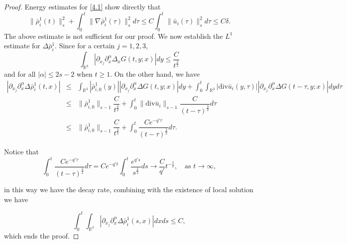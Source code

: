 \documentclass[reqno,twoside,12pt,a4paper]{amsart}
\newcommand{\R}{\mathbb{R}}
\newcommand{\al}{\alpha}
\newcommand{\dive}{\mathrm{div}}
\newcommand{\pa}{\partial}
\newcommand{\D}{\nabla}
\numberwithin{equation}{section}
\begin{document}
\begin{proof}
Energy estimates for \eqref{4.1} show directly that
\[
\|\bar{\rho}_i^1(t)\|_s^2+\int_0^t\|\D\bar{\rho}_i^1(\tau)\|_s^2d\tau\leq C\int_0^t\|\bar{u}_i(\tau)\|_s^2d\tau\leq C\delta.
\]
The above estimate is not sufficient for our proof. We now establish the $L^1$ estimate for $\Delta \bar{\rho}_{i}^1$. Since for a certain $j=1,2,3$,
\[
\int_{\R^3}|\pa_{x_j}\partial^\alpha_x \Delta_x G(t,y;x)|dy\leq \dfrac{C}{t^{\frac{3}{2}}}
\]
and for all $|\alpha|\leq 2s-2$ when $t\geq 1$.
On the other hand, we have
\begin{eqnarray}
|\pa_{x_j}\pa_x^\al \Delta\bar{\rho}_i^1(t,x)|&\leq&\int_{\R^3} |\bar{\rho}_{i,0}^1(y)||\pa_{x_j} \partial^\alpha_x \Delta G(t,y;x)|dy+ \int_0^t\int_{\R^3}|\dive\bar{u}_i(y,\tau)||\pa_{x_j} \partial^\alpha_x \Delta G(t-\tau,y;x)|dyd\tau\nonumber\\
&\leq& \|\bar{\rho}_{i,0}^1\|_{s-1}\dfrac{C}{t^{\frac{3}{2}}}+\int_0^t\|\dive\bar{u}_i\|_{s-1}\dfrac{C}{(t-\tau)^{\frac{3}{2}}}d\tau\nonumber\\
&\leq&\|\bar{\rho}_{i,0}^1\|_{s-1}\dfrac{C}{t^{\frac{3}{2}}}+\int_0^t\dfrac{C e^{-q'\tau}}{(t-\tau)^{\frac{3}{2}}}d\tau.
\end{eqnarray}

Notice that 
\[
\int_0^t\dfrac{C e^{-q'\tau}}{(t-\tau)^{\frac{3}{2}}}d\tau=C e^{-q't}\int_0^t\dfrac{e^{q's}}{s^{\frac{3}{2}}}ds\to \dfrac{C }{q'}{t^{-\frac{3}{2}}}, \quad \text{as}\,\, t\to\infty,
\]

in this way we have the decay rate, combining with the existence of local solution we have

\[
\int_0^t \int_{\mathbb{R}^3}  |\pa_{x_j}\pa_x^\al \Delta\bar{\rho}_i^1(s,x)| dx ds \leq C, 
\]
which ends the proof.


\end{proof}
\end{document}
